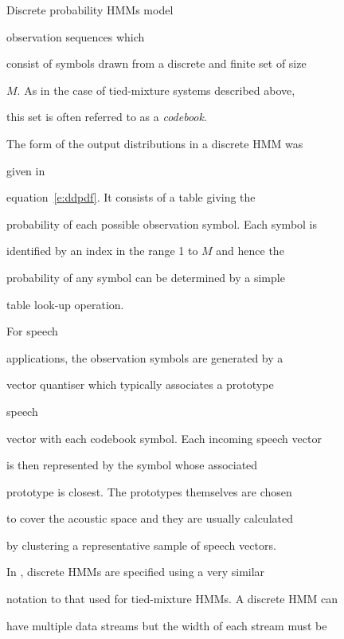 




Discrete probability HMMs model 


observation sequences  which


consist of symbols drawn from a discrete and finite set of size


$M$.  As in the case of tied-mixture  systems described above,


this set is often referred to as a \textit{codebook}. 





The form of the output distributions in a discrete HMM was 


given in


equation~\ref{e:ddpdf}.  It consists of a table  giving the


probability of each possible observation symbol.  Each symbol is


identified by an index in the range 1 to $M$ and hence the


probability of any symbol can be determined by a simple


table look-up operation.





For speech


applications,  the observation symbols are generated by a 


vector quantiser which typically associates a prototype 


speech


vector with each codebook symbol.  Each incoming speech vector


is then represented by the symbol whose associated 


prototype is closest.  The prototypes themselves are chosen


to cover the acoustic space and they are usually calculated


by clustering a representative sample of speech vectors. 





In \HTK, discrete HMMs are specified using a very similar


notation to that used for tied-mixture HMMs.  A discrete HMM can


have multiple data streams but the width of each stream must be


